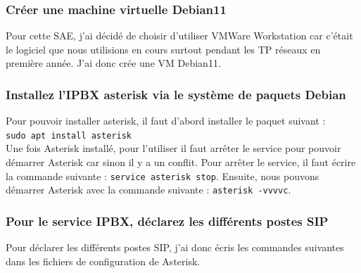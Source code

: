 \documentclass[12pt, a4paper]{article}
\begin{document}
	\subsubsection{Créer une machine virtuelle Debian11}
	Pour cette SAE, j'ai décidé de choisir d'utiliser VMWare Workstation car c'était
	le logiciel que nous utilisions en cours surtout pendant les TP réseaux en première
	année. J'ai donc crée une VM Debian11. 

	\subsubsection{Installez l'IPBX asterisk via le système de paquets Debian}
	Pour pouvoir installer asterisk, il faut d'abord installer le paquet suivant :\\
	
	\texttt{sudo apt install asterisk}\\

	Une fois Asterisk installé, pour l'utiliser il faut arrêter le service pour pouvoir
	démarrer Asterisk car sinon il y a un conflit. Pour arrêter le service, il faut
	écrire la commande suivante : \texttt{service asterisk stop}. Ensuite, nous
	pouvons démarrer Asterisk avec la commande suivante : \texttt{asterisk -vvvvc}.


	\subsubsection{Pour le service IPBX, déclarez les différents postes SIP}
	Pour déclarer les différents postes SIP, j'ai donc écris les commandes suivantes
	dans les fichiers de configuration de Asterisk.\\
\end{document}
